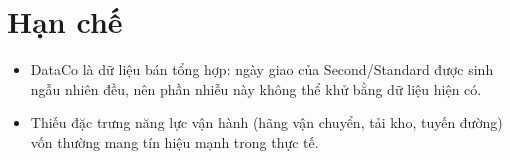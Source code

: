 \section{Hạn chế}
\begin{itemize}
  \item DataCo là dữ liệu bán tổng hợp: ngày giao của Second/Standard được sinh ngẫu nhiên đều, nên phần nhiễu này không thể khử bằng dữ liệu hiện có.
  \item Thiếu đặc trưng năng lực vận hành (hãng vận chuyển, tải kho, tuyến đường) vốn thường mang tín hiệu mạnh trong thực tế.
\end{itemize}
